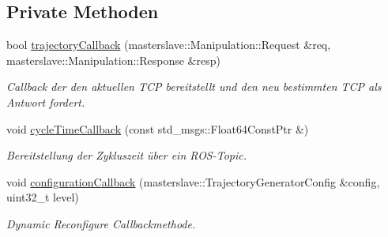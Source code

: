 \subsection*{Private Methoden}
\begin{DoxyCompactItemize}
\item 
bool \hyperlink{classTrajectoryGenerator_a78db2b3652839b0f16e959a859be78d1}{trajectory\-Callback} (masterslave\-::\-Manipulation\-::\-Request \&req, masterslave\-::\-Manipulation\-::\-Response \&resp)
\begin{DoxyCompactList}\small\item\em Callback der den aktuellen T\-C\-P bereitstellt und den neu bestimmten T\-C\-P als Antwort fordert. \end{DoxyCompactList}\item 
\hypertarget{classTrajectoryGenerator_a348c539543ae503b73b4f5380026a7cd}{void \hyperlink{classTrajectoryGenerator_a348c539543ae503b73b4f5380026a7cd}{cycle\-Time\-Callback} (const std\-\_\-msgs\-::\-Float64\-Const\-Ptr \&)}\label{classTrajectoryGenerator_a348c539543ae503b73b4f5380026a7cd}

\begin{DoxyCompactList}\small\item\em Bereitstellung der Zykluszeit über ein R\-O\-S-\/\-Topic. \end{DoxyCompactList}\item 
void \hyperlink{classTrajectoryGenerator_a542a3d9e6012e504a9bdd3e4d4415d97}{configuration\-Callback} (masterslave\-::\-Trajectory\-Generator\-Config \&config, uint32\-\_\-t level)
\begin{DoxyCompactList}\small\item\em Dynamic Reconfigure Callbackmethode. \end{DoxyCompactList}\end{DoxyCompactItemize}
